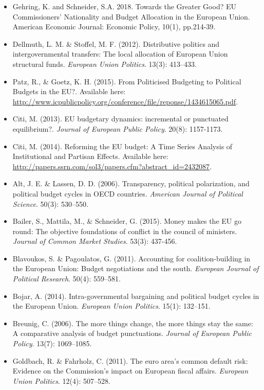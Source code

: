 \begin{itemize}
	\item Gehring, K. and Schneider, S.A. 2018. Towards the Greater Good? EU Commissioners' Nationality and Budget Allocation in the European Union. American Economic Journal: Economic Policy, 10(1), pp.214-39.
	\item Dellmuth, L. M. \& Stoffel, M. F. (2012). Distributive politics and intergovernmental transfers: The local allocation of European Union structural funds. \textit{European Union Politics}. 13(3): 413–433.
	\item Patz, R., \& Goetz, K. H. (2015). From Politicised Budgeting to Political Budgets in the EU?. Available here: \url{http://www.icpublicpolicy.org/conference/file/reponse/1434615065.pdf}.
	\item Citi, M. (2013). EU budgetary dynamics: incremental or punctuated equilibrium?. \textit{Journal of European Public Policy}. 20(8): 1157-1173.
	\item Citi, M. (2014). Reforming the EU budget: A Time Series Analysis of Institutional and Partisan Effects. Available here: \url{http://papers.ssrn.com/sol3/papers.cfm?abstract_id=2432087}.
	\item Alt, J. E. \& Lassen, D. D. (2006). Transparency, political polarization, and political budget cycles in OECD countries. \textit{American Journal of Political Science}. 50(3): 530–550.
	\item Bailer, S., Mattila, M., \& Schneider, G. (2015). Money makes the EU go round: The objective foundations of conflict in the council of ministers. \textit{Journal of Common Market Studies}. 53(3): 437-456.
	\item Blavoukos, S. \& Pagoulatos, G. (2011). Accounting for coalition-building in the European Union: Budget negotiations and the south. \textit{European Journal of Political Research}. 50(4): 559–581.
	\item Bojar, A. (2014). Intra-governmental bargaining and political budget cycles in the European Union. \textit{European Union Politics}. 15(1): 132–151.
	\item Breunig, C. (2006). The more things change, the more things stay the same: A comparative analysis of budget punctuations. \textit{Journal of European Public Policy}. 13(7): 1069–1085.
	\item Goldbach, R. \& Fahrholz, C. (2011). The euro area’s common default risk: Evidence on the Commission’s impact on European fiscal affairs. \textit{European Union Politics}. 12(4): 507–528.

\end{itemize}

